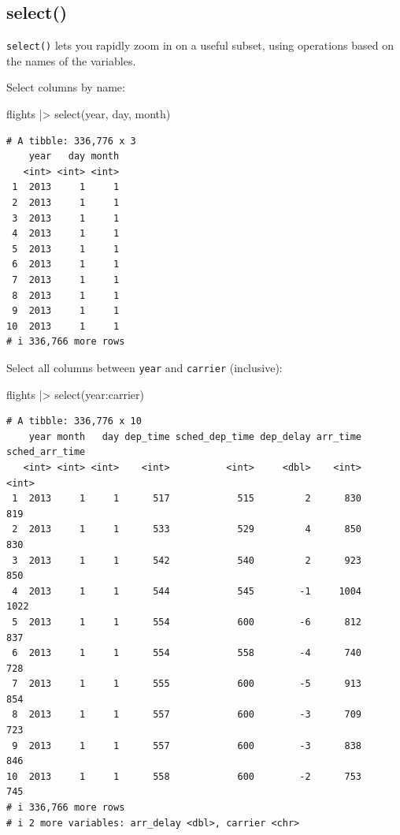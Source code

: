 \documentclass[
  letterpaper,
  DIV=11,
  numbers=noendperiod]{scrreprt}
\newenvironment{Shaded}{\begin{snugshade}}{\end{snugshade}}
\newcommand{\FunctionTok}[1]{\textcolor[rgb]{0.28,0.35,0.67}{#1}}
\newcommand{\NormalTok}[1]{\textcolor[rgb]{0.00,0.23,0.31}{#1}}
\newcommand{\SpecialCharTok}[1]{\textcolor[rgb]{0.37,0.37,0.37}{#1}}
\begin{document}
\subsection{select()}\label{select}

\texttt{select()} lets you rapidly zoom in on a useful subset, using
operations based on the names of the variables.

Select columns by name:

\begin{Shaded}
\begin{Highlighting}[]
\NormalTok{flights }\SpecialCharTok{|\textgreater{}}
  \FunctionTok{select}\NormalTok{(year, day, month)}
\end{Highlighting}
\end{Shaded}

\begin{verbatim}
# A tibble: 336,776 x 3
    year   day month
   <int> <int> <int>
 1  2013     1     1
 2  2013     1     1
 3  2013     1     1
 4  2013     1     1
 5  2013     1     1
 6  2013     1     1
 7  2013     1     1
 8  2013     1     1
 9  2013     1     1
10  2013     1     1
# i 336,766 more rows
\end{verbatim}

Select all columns between \texttt{year} and \texttt{carrier}
(inclusive):

\begin{Shaded}
\begin{Highlighting}[]
\NormalTok{flights }\SpecialCharTok{|\textgreater{}}
  \FunctionTok{select}\NormalTok{(year}\SpecialCharTok{:}\NormalTok{carrier)}
\end{Highlighting}
\end{Shaded}

\begin{verbatim}
# A tibble: 336,776 x 10
    year month   day dep_time sched_dep_time dep_delay arr_time sched_arr_time
   <int> <int> <int>    <int>          <int>     <dbl>    <int>          <int>
 1  2013     1     1      517            515         2      830            819
 2  2013     1     1      533            529         4      850            830
 3  2013     1     1      542            540         2      923            850
 4  2013     1     1      544            545        -1     1004           1022
 5  2013     1     1      554            600        -6      812            837
 6  2013     1     1      554            558        -4      740            728
 7  2013     1     1      555            600        -5      913            854
 8  2013     1     1      557            600        -3      709            723
 9  2013     1     1      557            600        -3      838            846
10  2013     1     1      558            600        -2      753            745
# i 336,766 more rows
# i 2 more variables: arr_delay <dbl>, carrier <chr>
\end{verbatim}
\end{document}
